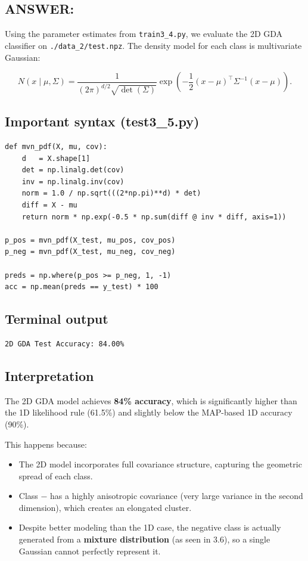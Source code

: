 \documentclass[12pt]{article}
\begin{document}
\subsection*{ANSWER:}
Using the parameter estimates from \texttt{train3\_4.py}, we evaluate the 2D GDA classifier on
\texttt{./data\_2/test.npz}.  
The density model for each class is multivariate Gaussian:

\[
N(x \mid \mu, \Sigma)
=
\frac{1}{(2\pi)^{d/2}\sqrt{\det(\Sigma)}}
\exp\!\left(
-\frac{1}{2}(x-\mu)^\top \Sigma^{-1} (x-\mu)
\right).
\]

\subsection*{Important syntax (test3\_5.py)}
\begin{lstlisting}
def mvn_pdf(X, mu, cov):
    d   = X.shape[1]
    det = np.linalg.det(cov)
    inv = np.linalg.inv(cov)
    norm = 1.0 / np.sqrt(((2*np.pi)**d) * det)
    diff = X - mu
    return norm * np.exp(-0.5 * np.sum(diff @ inv * diff, axis=1))

p_pos = mvn_pdf(X_test, mu_pos, cov_pos)
p_neg = mvn_pdf(X_test, mu_neg, cov_neg)

preds = np.where(p_pos >= p_neg, 1, -1)
acc = np.mean(preds == y_test) * 100
\end{lstlisting}

\subsection*{Terminal output}
\begin{lstlisting}
2D GDA Test Accuracy: 84.00%
\end{lstlisting}

\subsection*{Interpretation}
The 2D GDA model achieves \textbf{84\% accuracy}, which is significantly higher than the
1D likelihood rule (61.5\%) and slightly below the MAP-based 1D accuracy (90\%).

This happens because:

\begin{itemize}
    \item The 2D model incorporates full covariance structure, capturing the geometric spread of each class.
    \item Class $-$ has a highly anisotropic covariance (very large variance in the second dimension), which creates an elongated cluster.
    \item Despite better modeling than the 1D case, the negative class is actually generated from a \textbf{mixture distribution} (as seen in 3.6), so a single Gaussian cannot perfectly represent it.
\end{itemize}
\end{document}
